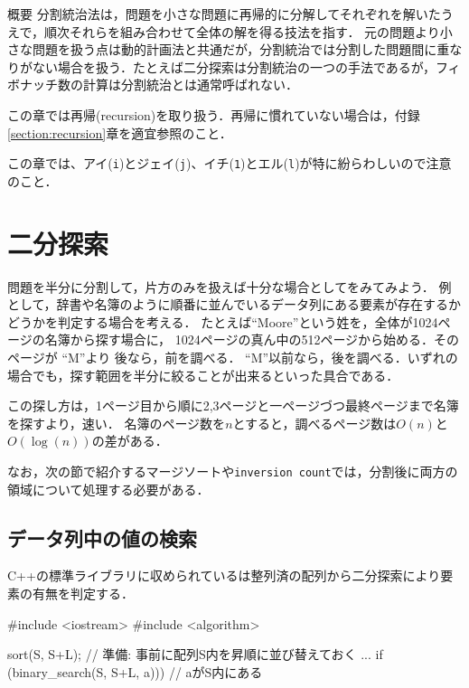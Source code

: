 \begin{itembox}[l]{概要}
分割統治法は，問題を小さな問題に再帰的に分解してそれぞれを解いたうえで，順次それらを組み合わせて全体の解を得る技法を指す．
元の問題より小さな問題を扱う点は動的計画法と共通だが，分割統治では分割した問題間に重なりがない場合を扱う．たとえば二分探索は分割統治の一つの手法であるが，フィボナッチ数の計算は分割統治とは通常呼ばれない．

この章では再帰(recursion)を取り扱う．再帰に慣れていない場合は，付録\ref{section:recursion}章を適宜参照のこと．
\end{itembox}

この章では、アイ(\texttt{i})とジェイ(\texttt{j})、イチ(\texttt{1})とエル(\texttt{l})が特に紛らわしいので注意のこと．



\section{二分探索}\label{section:binary-search}

問題を半分に分割して，片方のみを扱えば十分な場合としてをみてみよう．
例として，辞書や名簿のように順番に並んでいるデータ列にある要素が存在するかどうかを判定する場合を考える．
たとえば``Moore''という姓を，全体が1024ページの名簿から探す場合に，
1024ページの真ん中の512ページから始める．そのページが ``M''より
  後なら，前を調べる． ``M''以前なら，後を調べる．いずれの場合でも，探す範囲を半分に絞ることが出来るといった具合である．

この探し方は，1ページ目から順に2,3ページと一ページづつ最終ページまで名簿を探すより，速い．
名簿のページ数を$n$とすると，調べるページ数は$O(n)$と$O(\log(n))$の差がある．

なお，次の節で紹介するマージソートや\texttt{inversion count}では，分割後に両方の領域について処理する必要がある．

\subsection{データ列中の値の検索}

C++の標準ライブラリに収められているは整列済の配列から二分探索により要素の有無を判定する．

\begin{cbox}[emph={sort,binary_search}]
#include <iostream>
#include <algorithm>

sort(S, S+L); // 準備: 事前に配列S内を昇順に並び替えておく
...
    if (binary_search(S, S+L, a))) {
       // aがS内にある
    }
\end{cbox}

